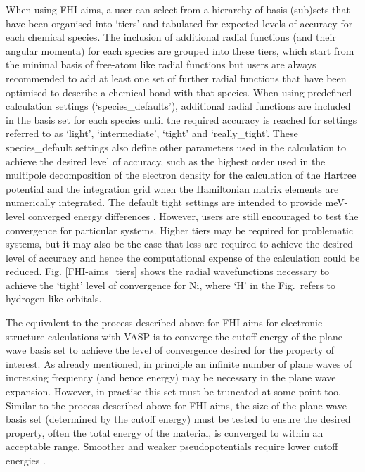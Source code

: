 \documentclass[11pt, twoside]{report}
\begin{document}
When using FHI-aims, a user can select from a hierarchy of basis (sub)sets that have been organised into `tiers' and tabulated for expected levels of accuracy for each chemical species. The inclusion of additional radial functions (and their angular momenta) for each species are grouped into these tiers, which start from the minimal basis of free-atom like radial functions but users are always recommended to add at least one set of further radial functions that have been optimised to describe a chemical bond with that species.  When using predefined calculation settings (`species\_defaults'), additional radial functions are included in the basis set for each species until the required accuracy is reached for settings referred to as `light', `intermediate', `tight' and `really\_tight'. These species\_default settings also define other parameters used in the calculation to achieve the desired level of accuracy, such as the highest order used in the multipole decomposition of the electron density for the calculation of the Hartree potential and the integration grid when the Hamiltonian matrix elements are numerically integrated. The default tight settings are intended to provide meV-level converged energy differences \cite{FHI-aims_manual}. However, users are still encouraged to test the convergence for particular systems. Higher tiers may be required for problematic systems, but it may also be the case that less are required to achieve the desired level of accuracy and hence the computational expense of the calculation could be reduced. Fig. \ref{FHI-aims_tiers} shows the radial wavefunctions necessary to achieve the `tight' level of convergence for Ni, where `H' in the Fig.~refers to hydrogen-like orbitals. 

The equivalent to the process described above for FHI-aims for electronic structure calculations with VASP is to converge the cutoff energy of the plane wave basis set to achieve the level of convergence desired for the property of interest. As already mentioned, in principle an infinite number of plane waves of increasing frequency (and hence energy) may be necessary in the plane wave expansion. However, in practise this set must be truncated at some point too. Similar to the process described above for FHI-aims, the size of the plane wave basis set (determined by the cutoff energy) must be tested to ensure the desired property, often the total energy of the material, is converged to within an acceptable range. Smoother and weaker pseudopotentials require lower cutoff energies \cite{Prasad_ch6}.
\end{document}
